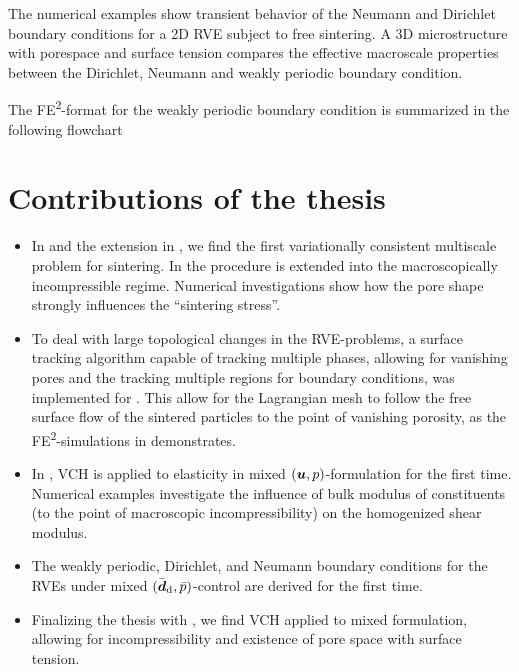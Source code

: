 \documentclass[MikaelDissertation.tex]{subfiles}
\begin{document}
\begin{itemize}
The numerical examples show transient behavior of the Neumann and Dirichlet boundary conditions for a 2D RVE subject to free sintering.
A 3D microstructure with porespace and surface tension compares the effective macroscale properties between the Dirichlet, Neumann and weakly periodic boundary condition.

The FE\textsuperscript{2}-format for the weakly periodic boundary condition is summarized in the following flowchart
\begin{center}
  
\end{center}

\end{itemize}


\chapter{Contributions of the thesis}
\begin{itemize}
 \item In  and the extension in , we find the first variationally consistent multiscale problem for sintering.
   In  the procedure is extended into the macroscopically incompressible regime. Numerical investigations show how the pore shape strongly influences the ``sintering stress''.
 \item To deal with large topological changes in the RVE-problems, a surface tracking algorithm capable of tracking multiple phases, allowing for vanishing pores and the tracking multiple regions for boundary conditions, was implemented for . 
   This allow for the Lagrangian mesh to follow the free surface flow of the sintered particles to the point of vanishing porosity, as the FE\textsuperscript{2}-simulations in  demonstrates.
 \item In , VCH is applied to elasticity in mixed $(\boldsymbol{u},p)$-formulation for the first time.
  Numerical examples investigate the influence of bulk modulus of constituents (to the point of macroscopic incompressibility) on the homogenized shear modulus.
 \item The weakly periodic, Dirichlet, and Neumann boundary conditions for the RVEs under mixed $(\bar{\boldsymbol{d}}_{\mathrm{d}},\bar{p})$-control are derived for the first time.
 \item Finalizing the thesis with , we find VCH applied to mixed formulation, allowing for incompressibility and existence of pore space with surface tension.
\end{itemize}
\end{document}
